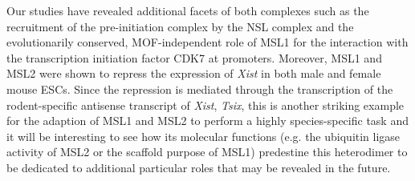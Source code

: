 Our studies have revealed additional facets of both complexes such as the recruitment of the pre-initiation complex by the NSL complex and the evolutionarily conserved, MOF-independent role of MSL1 for the interaction with the transcription initiation factor CDK7 at promoters. Moreover, MSL1 and MSL2 were shown to repress the expression of \textit{Xist} in both male and female mouse ESCs. Since the repression is mediated through the transcription of the rodent-specific antisense transcript of \textit{Xist}, \textit{Tsix}, this is another striking example for the adaption of MSL1 and MSL2 to perform a highly species-specific task and it will be interesting to see how its molecular functions (e.g. the ubiquitin ligase activity of MSL2 or the scaffold purpose of MSL1) predestine this heterodimer to be dedicated to additional particular roles that may be revealed in the future.
